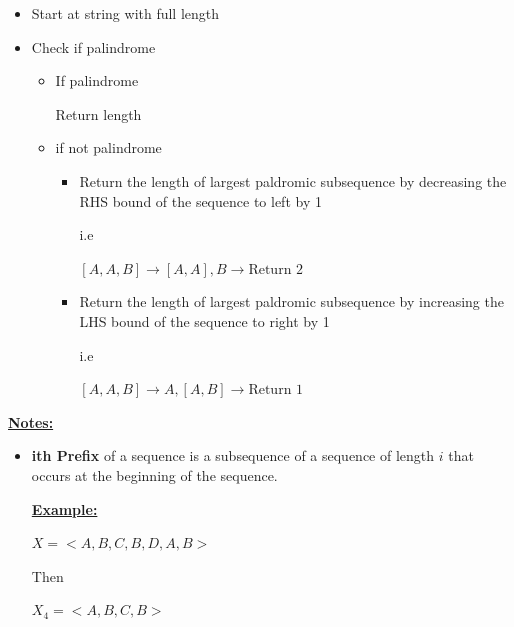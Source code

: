 \documentclass[12pt]{article}
\begin{document}
\begin{enumerate}[1.]
    \begin{itemize}
        \item Start at string with full length
        \item Check if palindrome

        \begin{itemize}
            \item If palindrome

            \bigskip

            Return length
            \item if not palindrome

            \begin{itemize}
                \item Return the length of largest paldromic subsequence
                by decreasing the RHS bound of the sequence to left by 1

                \bigskip

                i.e

                \bigskip

                $[A,A,B] \to [A,A],B \to \text{Return 2}$

                \item Return the length of largest paldromic subsequence
                by increasing the LHS bound of the sequence to right by 1



                \bigskip

                i.e

                \bigskip

                $[A,A,B] \to A,[A,B] \to \text{Return 1}$
            \end{itemize}
        \end{itemize}

    \end{itemize}
    \underline{\textbf{Notes:}}

    \bigskip

    \begin{itemize}
        \item \textbf{ith Prefix} of a sequence is a subsequence of a sequence of length $i$ that occurs at the beginning of the sequence.

        \bigskip

        \underline{\textbf{Example:}}

        \bigskip

        $X = <A,B,C,B,D,A,B>$

        \bigskip

        Then

        \bigskip

        $X_4 = <A,B,C,B>$
    \end{itemize}
\end{enumerate}
\end{document}
